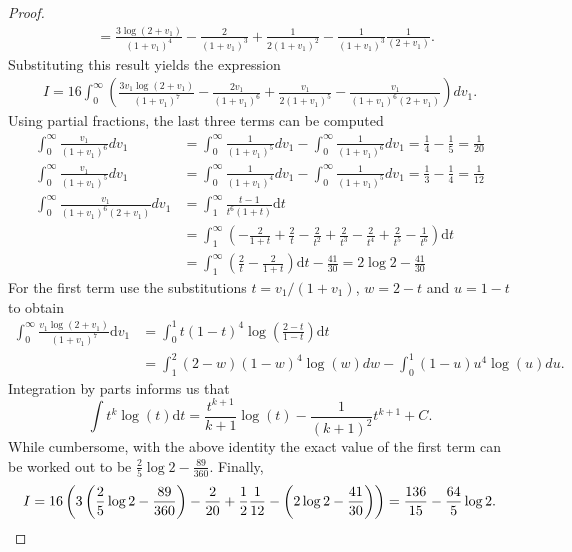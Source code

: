 \documentclass[10pt,a4paper]{amsart}
\newcommand{\dd}{\mathrm{d}}
\begin{document}
\begin{proof}
\begin{align*}
        &=\frac{3\log\left(2+v_{1}\right)}{\left(1+v_{1}\right)^{4}}-\frac{2}{\left(1+v_{1}\right)^{3}}+\frac{1}{2\left(1+v_{1}\right)^{2}}-\frac{1}{\left(1+v_{1}\right)^{3}}\frac{1}{\left(2+v_{1}\right)}.
    \end{align*}
    Substituting this result yields the expression
    \begin{align*}
        I=16\int_{0}^{\infty}\left(\frac{3v_{1}\log\left(2+v_{1}\right)}{\left(1+v_{1}\right)^{7}}-\frac{2v_{1}}{\left(1+v_{1}\right)^{6}}+\frac{v_{1}}{2\left(1+v_{1}\right)^{5}}-\frac{v_{1}}{\left(1+v_{1}\right)^{6}\left(2+v_{1}\right)}\right)dv_{1}.
    \end{align*}
    Using partial fractions, the last three terms can be computed
    \begin{align*}
        \int_{0}^{\infty}\frac{v_{1}}{\left(1+v_{1}\right)^{6}}dv_{1}&=\int_{0}^{\infty}\frac{1}{\left(1+v_{1}\right)^{5}}dv_{1}-\int_{0}^{\infty}\frac{1}{\left(1+v_{1}\right)^{6}}dv_{1}=\frac{1}{4}-\frac{1}{5}=\frac{1}{20}\\
        \int_{0}^{\infty}\frac{v_{1}}{\left(1+v_{1}\right)^{5}}dv_{1}&=\int_{0}^{\infty}\frac{1}{\left(1+v_{1}\right)^{4}}dv_{1}-\int_{0}^{\infty}\frac{1}{\left(1+v_{1}\right)^{5}}dv_{1}=\frac{1}{3}-\frac{1}{4}=\frac{1}{12}\\
        \int_{0}^{\infty}\frac{v_{1}}{\left(1+v_{1}\right)^{6}\left(2+v_{1}\right)}dv_{1}&=\int_1^\infty\frac{t-1}{t^6(1+t)}\dd t\\
        &=\int_1^\infty\left(-\frac{2}{1+t}+\frac{2}{t}-\frac{2}{t^{2}}+\frac{2}{t^{3}}-\frac{2}{t^{4}}+\frac{2}{t^{5}}-\frac{1}{t^{6}}\right)\dd t\\&=\int_1^\infty\left(\frac{2}{t}-\frac{2}{1+t}\right)\dd t-\frac{41}{30}=2\log 2-\frac{41}{30}
    \end{align*}
    For the first term use the substitutions $t=v_1/(1+v_1)$, $w=2-t$ and $u=1-t$ to obtain
    \begin{align*}
        \int_{0}^{\infty}\frac{v_1\log\left(2+v_1\right)}{\left(1+v_1\right)^{7}}\dd v_1&=\int_{0}^{1}t\left(1-t\right)^{4}\log\left(\frac{2-t}{1-t}\right)\dd t\\
        &=\int_{1}^{2}\left(2-w\right)\left(1-w\right)^{4}\log\left(w\right)dw-\int_{0}^{1}\left(1-u\right)u^{4}\log\left(u\right)du.
    \end{align*}
    Integration by parts informs us that
    $$
    \int t^k\log (t)\dd t=\frac{t^{k+1}}{k+1}\log(t)-\frac{1}{(k+1)^2} t^{k+1}+C.
    $$
    While cumbersome, with the above identity the exact value of the first term can be worked out to be $\frac{2}{5}\log2-\frac{89}{360}$. Finally,
    \begin{equation*}
        I=16\left(3\left(\frac{2}{5}\log2-\frac{89}{360}\right)-\frac{2}{20}+\frac{1}{2}\frac{1}{12}-\left(2\log 2-\frac{41}{30}\right)\right)=\frac{136}{15}-\frac{64}{5}\log2. \qedhere
    \end{equation*}
\end{proof}
\end{document}
